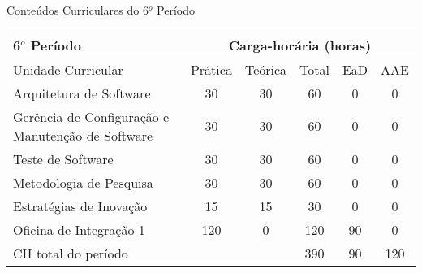\begin{quadro}[ht!]
\centering
\caption{Conteúdos Curriculares do 6$^o$ Período}\label{qua:periodo6}
\begin{tabular}{|p{8.0cm}|c|c|c|c|c|}
\hline
\rowcolor{blue1} 6$^o$ Período & \multicolumn{5}{|c|}{\centering Carga-horária (horas)} \\ \hline
\rowcolor{blue1} Unidade Curricular & Prática & Teórica & Total & EaD & AAE \\ \hline
Arquitetura de Software & 30 & 30 & 60 & 0	&	0 \\	\hline
Gerência de Configuração e Manutenção de Software & 30 & 30 & 60 & 0	&	0 \\	\hline
Teste de Software  & 30 & 30 & 60 & 0	&	0 \\	\hline
Metodologia de Pesquisa & 30 & 30 & 60 & 0	&	0 \\	\hline
Estratégias de Inovação & 15 & 15 & 30 & 0	&	0 \\	\hline
Oficina de Integração 1 & 120 & 0 & 120 & 90	&	0 \\	\hline
CH total do período & \multicolumn{2}{p{3.3cm}|}{\cellcolor{blue1}} & 390 & 90	&	120 \\ \hline
\end{tabular} \end{quadro}